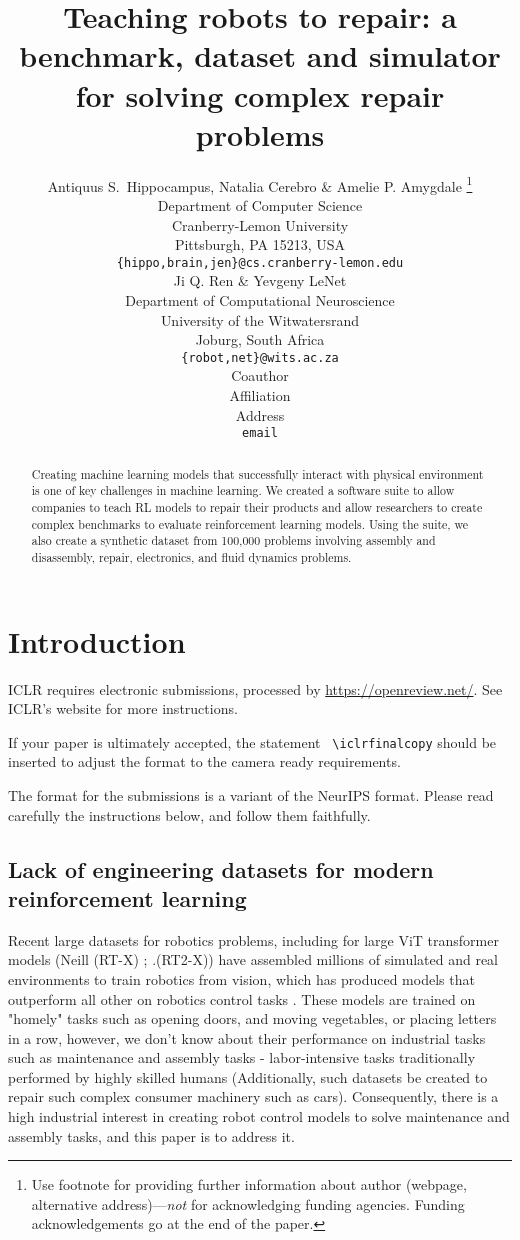 \documentclass{article} %
\title{Teaching robots to repair:  a benchmark, dataset and simulator for solving complex repair problems}
\author{Antiquus S.~Hippocampus, Natalia Cerebro \& Amelie P. Amygdale \thanks{ Use footnote for providing further information
about author (webpage, alternative address)---\emph{not} for acknowledging
funding agencies.  Funding acknowledgements go at the end of the paper.} \\
Department of Computer Science\\
Cranberry-Lemon University\\
Pittsburgh, PA 15213, USA \\
\texttt{\{hippo,brain,jen\}@cs.cranberry-lemon.edu} \\
\And
Ji Q. Ren \& Yevgeny LeNet \\
Department of Computational Neuroscience \\
University of the Witwatersrand \\
Joburg, South Africa \\
\texttt{\{robot,net\}@wits.ac.za} \\
\AND
Coauthor \\
Affiliation \\
Address \\
\texttt{email}
}
\begin{document}
\maketitle

\begin{abstract}
Creating machine learning models that successfully interact with physical environment is one of key challenges in machine learning. We created a software suite to allow companies to teach RL models to repair their products and allow researchers to create complex benchmarks to evaluate reinforcement learning models. Using the suite, we also create a synthetic dataset from 100,000 problems involving assembly and disassembly, repair, electronics, and fluid dynamics problems.
\end{abstract}

\section{Introduction}

ICLR requires electronic submissions, processed by
\url{https://openreview.net/}. See ICLR's website for more instructions.

If your paper is ultimately accepted, the statement {\tt
  {\textbackslash}iclrfinalcopy} should be inserted to adjust the
format to the camera ready requirements.

The format for the submissions is a variant of the NeurIPS format.
Please read carefully the instructions below, and follow them
faithfully.

\subsection{Lack of engineering datasets for modern reinforcement learning}

Recent large datasets for robotics problems, including for large ViT transformer models (Neill (RT-X) ; .(RT2-X)) have assembled millions of simulated and real environments to train robotics from vision, which has produced models that outperform all other on robotics control tasks  \cite{RT2-X}. These models are trained on "homely" tasks such as opening doors, and moving vegetables, or placing letters in a row, however, we don't know about their performance on industrial tasks such as maintenance and assembly tasks - labor-intensive tasks traditionally performed by highly skilled humans (Additionally, such datasets be created to repair such complex consumer machinery such as cars). Consequently, there is a high industrial interest in creating robot control models to solve maintenance and assembly tasks, and this paper is to address it.
\end{document}
